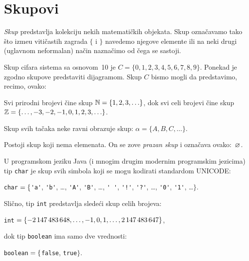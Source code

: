 \chapter{Skupovi}

\emph{Skup} predstavlja kolekciju nekih matemati\v ckih objekata.
Skup ozna\v cavamo tako \v sto izme\dj u viti\v castih zagrada $\{$ i $\}$ navedemo
njegove elemente ili na neki drugi (uglavnom neformalan) na\v cin nazna\v cimo od \v cega se sastoji.

\medskip

  Skup cifara sistema sa osnovom~10 je $C = \{0, 1, 2, 3, 4, 5, 6, 7, 8, 9\}$.
  Ponekad je zgodno skupove predstaviti dijagramom. Skup $C$ bismo mogli da predstavimo, recimo, ovako:
  \begin{center}
    
  \end{center}

\medskip

  Svi prirodni brojevi \v cine skup $\mathbb{N} = \{ 1, 2, 3, \ldots \}$, dok svi celi brojevi \v cine skup
  $\mathbb{Z} = \{ \ldots, -3, -2, -1, 0, 1, 2, 3, \ldots \}$.

\medskip

  Skup svih ta\v caka neke ravni obrazuje skup: $\alpha = \{A, B, C, \ldots\}$.
  \begin{center}
    
  \end{center}

  Postoji skup koji nema elemenata. On se zove \emph{prazan skup} i ozna\v cava ovako:~$\varnothing$.

\medskip


  U programskom jeziku Java (i mnogim drugim modernim programskim jezicima) tip \texttt{char} je skup svih simbola
  koji se mogu kodirati standardom UNICODE:
  \begin{center}
    \verb"char"$\mathstrut = \{$\verb"'a'", \verb"'b'", \ldots, \verb"'A'", \verb"'B'", \ldots, \verb*"' '", \verb"'!'", \verb"'?'", \ldots,
                                \verb"'0'", \verb"'1'", \ldots $\}$.
  \end{center}

\clearpage

\noindent
  Sli\v cno, tip \verb"int" predstavlja slede\'ci skup celih brojeva:
  \begin{center}
    \verb"int"$\mathstrut = \{ -2\,147\,483\,648, \ldots, -1, 0, 1, \ldots, 2\,147\,483\,647\}$,
  \end{center}
  dok tip \verb"boolean" ima samo dve vrednosti:
  \begin{center}
    \verb"boolean"$\mathstrut = \{$\verb"false", \verb"true"$\}$.
  \end{center}

